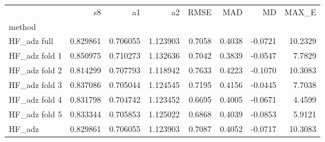 \begin{tabular}{lrrrrrrr}
 & s8 & a1 & a2 & RMSE & MAD & MD & MAX_E \\
method &  &  &  &  &  &  &  \\
HF_adz full & 0.829861 & 0.706055 & 1.123903 & 0.7058 & 0.4038 & -0.0721 & 10.2329 \\
HF_adz fold 1 & 0.850975 & 0.710273 & 1.132636 & 0.7042 & 0.3839 & -0.0547 & 7.7829 \\
HF_adz fold 2 & 0.814299 & 0.707793 & 1.118942 & 0.7633 & 0.4223 & -0.1070 & 10.3083 \\
HF_adz fold 3 & 0.837086 & 0.705044 & 1.124545 & 0.7195 & 0.4156 & -0.0445 & 7.7038 \\
HF_adz fold 4 & 0.831798 & 0.704742 & 1.123452 & 0.6695 & 0.4005 & -0.0671 & 4.4599 \\
HF_adz fold 5 & 0.833344 & 0.705853 & 1.125022 & 0.6868 & 0.4039 & -0.0853 & 5.9121 \\
HF_adz & 0.829861 & 0.706055 & 1.123903 & 0.7087 & 0.4052 & -0.0717 & 10.3083 \\
\end{tabular}
